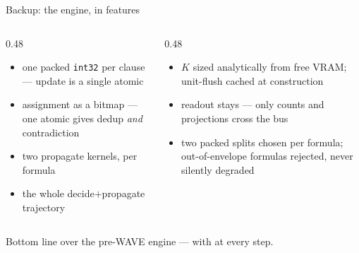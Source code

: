 \begin{frame}{Backup: the engine, in features}
  \begin{columns}[T]
    \begin{column}{0.48\textwidth}
      \begin{itemize}\small
        \item one packed \texttt{int32} per clause --- update is a single atomic
        \item assignment as a bitmap --- one atomic gives dedup \emph{and} contradiction
        \item two propagate kernels,  per formula
        \item the whole decide$+$propagate trajectory 
      \end{itemize}
    \end{column}
    \begin{column}{0.48\textwidth}
      \begin{itemize}\small
        \item $K$ sized analytically from free VRAM; unit-flush cached at construction
        \item readout stays  --- only counts and projections cross the bus
        \item two packed splits chosen per formula; out-of-envelope formulas rejected, never
          silently degraded
      \end{itemize}
    \end{column}
  \end{columns}
  \vspace{0.6em}
  \begin{block}{Bottom line}
    \centering
     over the pre-WAVE engine --- with
     at every step.
  \end{block}
\end{frame}

